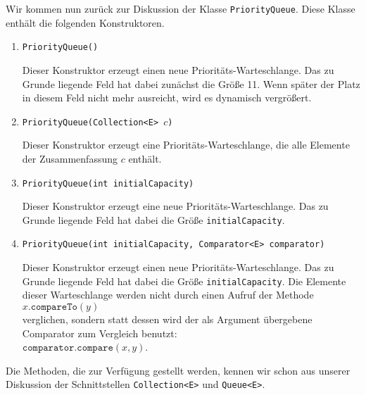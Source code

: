 Wir kommen nun zur\"uck zur Diskussion der Klasse \texttt{PriorityQueue}.
Diese Klasse enth\"alt die folgenden Konstruktoren.
\begin{enumerate}
\item \texttt{PriorityQueue()}

      Dieser Konstruktor erzeugt einen neue Priorit\"ats-Warteschlange.
      Das zu Grunde liegende Feld hat dabei zun\"achst die Gr\"o{\ss}e 11.
      Wenn sp\"ater der Platz in diesem Feld nicht mehr ausreicht, wird es dynamisch
      vergr\"o{\ss}ert. 
\item \texttt{PriorityQueue(Collection<E> $c$)}
  
      Dieser Konstruktor erzeugt eine Priorit\"ats-Warteschlange, die alle Elemente der
      Zusammenfassung $c$ enth\"alt.
\item \texttt{PriorityQueue(int initialCapacity)}
  
      Dieser Konstruktor  erzeugt eine neue Priorit\"ats-Warteschlange.
      Das zu Grunde liegende Feld hat dabei die Gr\"o{\ss}e \texttt{initialCapacity}.
\item \texttt{PriorityQueue(int initialCapacity, Comparator<E> comparator)}

      Dieser Konstruktor  erzeugt einen neue Priorit\"ats-Warteschlange.
      Das zu Grunde liegende Feld hat dabei die Gr\"o{\ss}e \texttt{initialCapacity}.
      Die Elemente dieser Warteschlange werden nicht durch einen Aufruf der
      Methode 
      \\[0.2cm]
      \hspace*{1.3cm}
      $x.\texttt{compareTo}(y)$ 
      \\[0.2cm]
      verglichen, sondern statt dessen wird der als Argument \"ubergebene Comparator
      zum Vergleich benutzt:
      \\[0.2cm]
      \hspace*{1.3cm}
      $\mathtt{comparator}.\texttt{compare}(x,y)$. 
\end{enumerate}
Die Methoden, die zur Verf\"ugung gestellt werden, kennen wir schon aus unserer Diskussion
der Schnittstellen \texttt{Collection<E>} und \texttt{Queue<E>}. 
